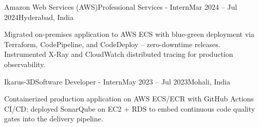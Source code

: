 \resumeExp
{Amazon Web Services (AWS)}{Professional Services - Intern}{Mar 2024 -- Jul 2024}{Hyderabad, India}
\resumeItemListStart
    \item[$\diamond$] Migrated on-premises application to AWS ECS with blue-green deployment via Terraform, CodePipeline, and CodeDeploy -- zero-downtime releases. Instrumented X-Ray and CloudWatch distributed tracing for production observability.
\resumeItemListEnd

\resumeExp
{Ikarus-3D}{Software Developer - Intern}{May 2023 -- Jul 2023}{Mohali, India}
\resumeItemListStart
    \item[$\diamond$] Containerized production application on AWS ECS/ECR with GitHub Actions CI/CD; deployed SonarQube on EC2 + RDS to embed continuous code quality gates into the delivery pipeline.
\resumeItemListEnd

\resumeSubHeadingListEnd
